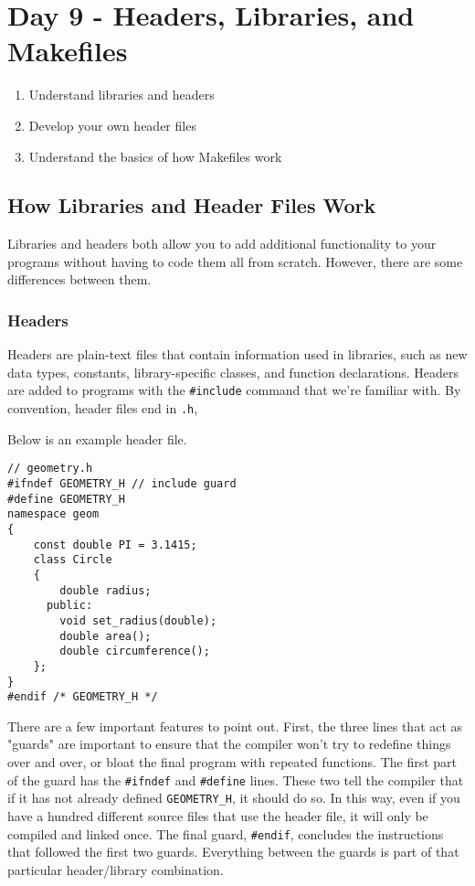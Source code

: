 \chapter{Day 9 - Headers, Libraries, and Makefiles}
\begin{Goals}
\begin{enumerate}
    \item Understand libraries and headers
    \item Develop your own header files
    \item Understand the basics of how Makefiles work
\end{enumerate}
\end{Goals}

\section{How Libraries and Header Files Work}
Libraries and headers both allow you to add additional functionality to your programs without having to code them all from scratch. However, there are some differences between them.

\subsection{Headers}
Headers are plain-text files that contain information used in libraries, such as new data types, constants, library-specific classes, and function declarations.  Headers are added to programs with the \texttt{\#include} command that we're familiar with.  By convention, header files end in \texttt{.h}, 

Below is an example header file.

\begin{verbatim}
// geometry.h
#ifndef GEOMETRY_H // include guard
#define GEOMETRY_H
namespace geom
{
    const double PI = 3.1415;
    class Circle 
    {
        double radius;
      public:
        void set_radius(double);
        double area();
        double circumference();
    };
}
#endif /* GEOMETRY_H */
\end{verbatim}

There are a few important features to point out.  First, the three lines that act as "guards" are important to ensure that the compiler won't try to redefine things over and over, or bloat the final program with repeated functions.  The first part of the guard has the \texttt{\#ifndef} and \texttt{\#define} lines.  These two tell the compiler that if it has not already defined \texttt{GEOMETRY\_H}, it should do so.  In this way, even if you have a hundred different source files that use the header file, it will only be compiled and linked once.  The final guard, \texttt{\#endif}, concludes the instructions that followed the first two guards.  Everything between the guards is part of that particular header/library combination.

